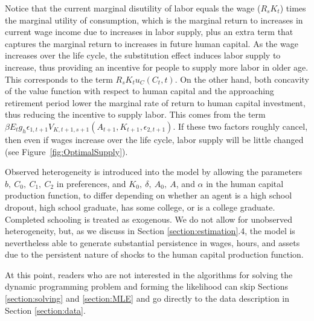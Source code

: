 \documentclass[\econtexRoot/ImaiKeane]{subfiles}
\begin{document}
           Notice that the current marginal disutility of labor equals the wage ($R_s K_t$) times the marginal utility of consumption, which is the marginal return to increases in current wage income due to increases in labor supply, plus an extra term that captures the marginal return to increases in future human capital. As the wage increases over the life cycle, the substitution effect induces labor supply to increase, thus providing an incentive for people to supply more labor in older age. This corresponds to the term $R_s K_t u_C(C_t, t)$. On the other hand, both concavity of the value function with respect to human capital and the approaching retirement period lower the marginal rate of return to human capital investment, thus reducing the incentive to supply labor. This comes from the term $\beta E_t g_h \epsilon_{1,t+1} V_{K,t+1,s+1}(A_{t+1}, K_{t+1}, \epsilon_{2,t+1})$. If these two factors roughly cancel, then even if wages increase over the life cycle, labor supply will be little changed (see Figure~\ref{fig:OptimalSupply}).\par
           Observed heterogeneity is introduced into the model by allowing the parameters $b,~C_0,~C_1,~C_2$ in preferences, and $K_0,~\delta,~A_0,~A$, and $\alpha$ in the human capital production function, to differ depending on whether an agent is a high school dropout, high school graduate, has some college, or is a college graduate. Completed schooling is treated as exogenous. We do not allow for unobserved heterogeneity, but, as we discuss in Section \ref{section:estimation}.4, the model is nevertheless able to generate substantial persistence in wages, hours, and assets due to the persistent nature of shocks to the human capital production function. \par
           At this point, readers who are not interested in the algorithms for solving the dynamic programming problem and forming the likelihood can skip Sections \ref{section:solving} and \ref{section:MLE} and go directly to the data description in Section \ref{section:data}.          
\end{document}
